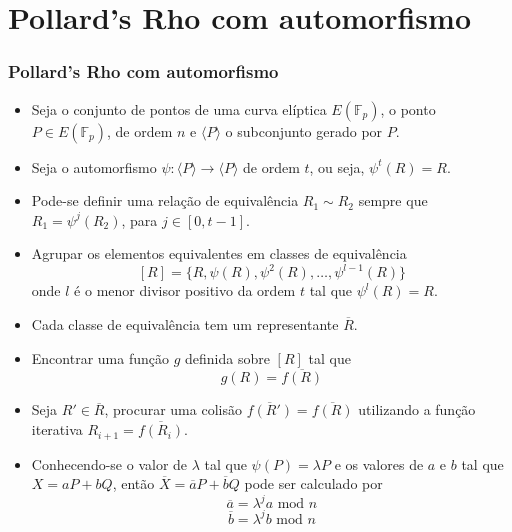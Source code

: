 \documentclass{beamer}
\begin{document}
%
%

\section{Pollard's Rho com automorfismo}
\begin{frame}
\frametitle{Pollard's Rho com automorfismo}
  \begin{itemize}
    \item Seja o conjunto de pontos de uma curva elíptica $E(\mathbb{F}_p)$, o ponto $P \in E(\mathbb{F}_p)$, de ordem $n$ e $\langle P \rangle$ o subconjunto gerado por $P$.
    \item Seja o automorfismo $\psi: \langle P \rangle \to \langle P \rangle$ de ordem $t$, ou seja, $\psi^t(R) = R$.
    \item Pode-se definir uma relação de equivalência $R_1 \sim R_2$ sempre que $R_1 = \psi^j(R_2)$, para $j \in [0, t-1]$.
    \item Agrupar os elementos equivalentes em classes de equivalência
    $$
      [R] = \{R, \psi(R), \psi^2(R), \dots, \psi^{l-1}(R)\}
    $$
    onde $l$ é o menor divisor positivo da ordem $t$ tal que $\psi^l(R) = R$.
  \end{itemize}
\end{frame}
\begin{frame}
  \begin{itemize}
    \item Cada classe de equivalência tem um representante $\overline{R}$.
    \item Encontrar uma função $g$ definida sobre $[R]$ tal que
    $$
      g(R) = \overline{f(R)}
    $$
    \item Seja $R' \in \overline{R}$, procurar uma colisão $\overline{f(R')} = \overline{f(R)}$ utilizando a função iterativa $R_{i+1} = \overline{f(R_i)}$.
    \item Conhecendo-se o valor de $\lambda$ tal que $\psi(P) = \lambda P$ e os valores de $a$ e $b$ tal que $X = aP + bQ$, então $\overline{X} = \overline{a}P + \overline{b}Q$ pode ser calculado por
    $$
      \overline{a} = \lambda^j a \mbox{ mod } n
    $$
    $$
      \overline{b} = \lambda^j b \mbox{ mod } n
    $$
  \end{itemize}
\end{frame}
\end{document}
